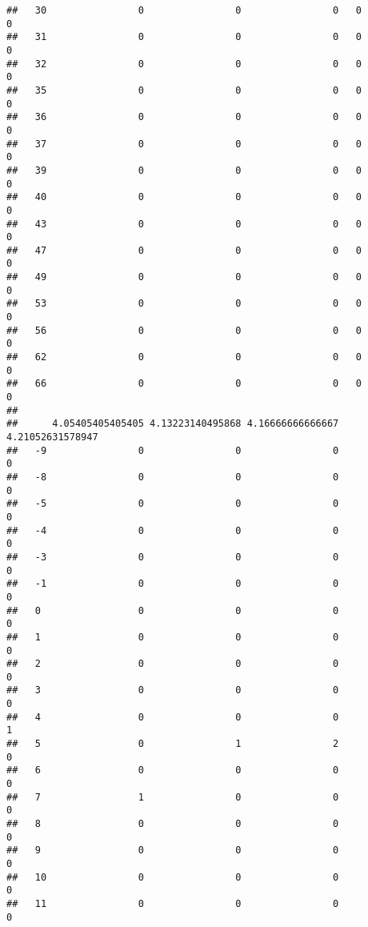 \documentclass[]{article}
\begin{document}
\begin{verbatim}
##   30                0                0                0   0                0
##   31                0                0                0   0                0
##   32                0                0                0   0                0
##   35                0                0                0   0                0
##   36                0                0                0   0                0
##   37                0                0                0   0                0
##   39                0                0                0   0                0
##   40                0                0                0   0                0
##   43                0                0                0   0                0
##   47                0                0                0   0                0
##   49                0                0                0   0                0
##   53                0                0                0   0                0
##   56                0                0                0   0                0
##   62                0                0                0   0                0
##   66                0                0                0   0                0
##     
##      4.05405405405405 4.13223140495868 4.16666666666667 4.21052631578947
##   -9                0                0                0                0
##   -8                0                0                0                0
##   -5                0                0                0                0
##   -4                0                0                0                0
##   -3                0                0                0                0
##   -1                0                0                0                0
##   0                 0                0                0                0
##   1                 0                0                0                0
##   2                 0                0                0                0
##   3                 0                0                0                0
##   4                 0                0                0                1
##   5                 0                1                2                0
##   6                 0                0                0                0
##   7                 1                0                0                0
##   8                 0                0                0                0
##   9                 0                0                0                0
##   10                0                0                0                0
##   11                0                0                0                0

\end{verbatim}
\end{document}
